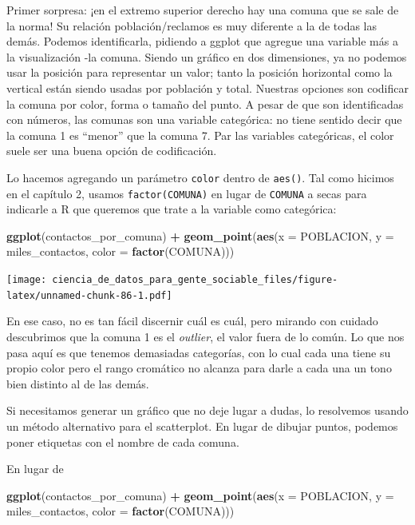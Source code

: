 \documentclass[spanish,]{book}
\newenvironment{Shaded}{\begin{snugshade}}{\end{snugshade}}
\newcommand{\DataTypeTok}[1]{\textcolor[rgb]{0.13,0.29,0.53}{#1}}
\newcommand{\KeywordTok}[1]{\textcolor[rgb]{0.13,0.29,0.53}{\textbf{#1}}}
\newcommand{\NormalTok}[1]{#1}
\newcommand{\OperatorTok}[1]{\textcolor[rgb]{0.81,0.36,0.00}{\textbf{#1}}}
\newcommand{\StringTok}[1]{\textcolor[rgb]{0.31,0.60,0.02}{#1}}
\begin{document}
Primer sorpresa: ¡en el extremo superior derecho hay una comuna que se sale de la norma! Su relación población/reclamos es muy diferente a la de todas las demás. Podemos identificarla, pidiendo a ggplot que agregue una variable más a la visualización -la comuna. Siendo un gráfico en dos dimensiones, ya no podemos usar la posición para representar un valor; tanto la posición horizontal como la vertical están siendo usadas por población y total. Nuestras opciones son codificar la comuna por color, forma o tamaño del punto. A pesar de que son identificadas con números, las comunas son una variable categórica: no tiene sentido decir que la comuna 1 es ``menor'' que la comuna 7. Par las variables categóricas, el color suele ser una buena opción de codificación.

Lo hacemos agregando un parámetro \texttt{color} dentro de \texttt{aes()}. Tal como hicimos en el capítulo 2, usamos \texttt{factor(COMUNA)} en lugar de \texttt{COMUNA} a secas para indicarle a R que queremos que trate a la variable como categórica:

\begin{Shaded}
\begin{Highlighting}[]
\KeywordTok{ggplot}\NormalTok{(contactos_por_comuna) }\OperatorTok{+}\StringTok{ }
\StringTok{    }\KeywordTok{geom_point}\NormalTok{(}\KeywordTok{aes}\NormalTok{(}\DataTypeTok{x =}\NormalTok{ POBLACION, }\DataTypeTok{y =}\NormalTok{ miles_contactos, }\DataTypeTok{color =} \KeywordTok{factor}\NormalTok{(COMUNA)))}
\end{Highlighting}
\end{Shaded}

\texttt{[image: ciencia\_de\_datos\_para\_gente\_sociable\_files/figure-latex/unnamed-chunk-86-1.pdf]}

En ese caso, no es tan fácil discernir cuál es cuál, pero mirando con cuidado descubrimos que la comuna 1 es el \emph{outlier}, el valor fuera de lo común. Lo que nos pasa aquí es que tenemos demasiadas categorías, con lo cual cada una tiene su propio color pero el rango cromático no alcanza para darle a cada una un tono bien distinto al de las demás.

Si necesitamos generar un gráfico que no deje lugar a dudas, lo resolvemos usando un método alternativo para el scatterplot. En lugar de dibujar puntos, podemos poner etiquetas con el nombre de cada comuna.

En lugar de

\begin{Shaded}
\begin{Highlighting}[]
\KeywordTok{ggplot}\NormalTok{(contactos_por_comuna) }\OperatorTok{+}\StringTok{ }
\StringTok{    }\KeywordTok{geom_point}\NormalTok{(}\KeywordTok{aes}\NormalTok{(}\DataTypeTok{x =}\NormalTok{ POBLACION, }\DataTypeTok{y =}\NormalTok{ miles_contactos, }\DataTypeTok{color =} \KeywordTok{factor}\NormalTok{(COMUNA)))}
\end{Highlighting}
\end{Shaded}
\end{document}
